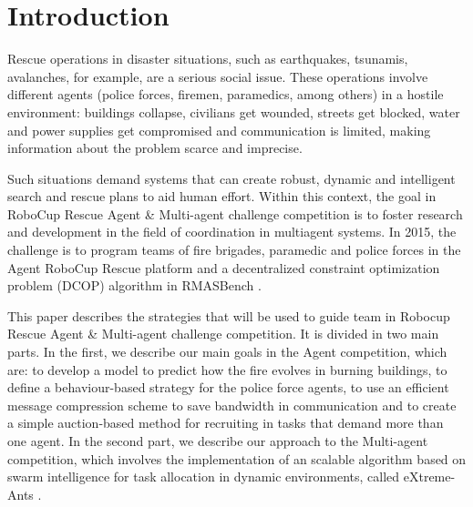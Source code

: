 \section{Introduction}
\label{sec:intro}

Rescue operations in disaster situations, such as earthquakes, tsunamis, avalanches, for example, are a serious social issue. These operations involve different agents (police forces, firemen, paramedics, among others) in a hostile environment: buildings collapse, civilians get wounded, streets get blocked, water and power supplies get compromised and communication is limited, making information about the problem scarce and imprecise.

Such situations demand systems that can create robust, dynamic and intelligent search and rescue plans to aid human effort. Within this context, the goal in RoboCup Rescue Agent \& Multi-agent challenge competition is to foster research and development in the field of coordination in multiagent systems. In 2015, the challenge is to program teams of fire brigades, paramedic and police forces in the Agent RoboCup Rescue platform \citep{Kitano2000} and a decentralized constraint optimization problem (DCOP) algorithm in RMASBench \citep{Kleiner+2013}. 


This paper describes the strategies that will be used to guide \teamname team in  Robocup Rescue Agent \& Multi-agent challenge competition. It is divided in two main parts. In the first, we describe our main goals in the Agent competition, which are: to develop a model to predict how the fire evolves in burning buildings, to define a behaviour-based strategy for the police force agents, to use an efficient message compression scheme to save bandwidth in communication and to create a simple auction-based method for recruiting in tasks that demand more than one agent. In the second part, we describe our approach to the Multi-agent competition, which involves the implementation of an scalable algorithm based on swarm intelligence for task allocation in dynamic environments, called eXtreme-Ants \citep{Santos&Bazzan2009optmas}.
